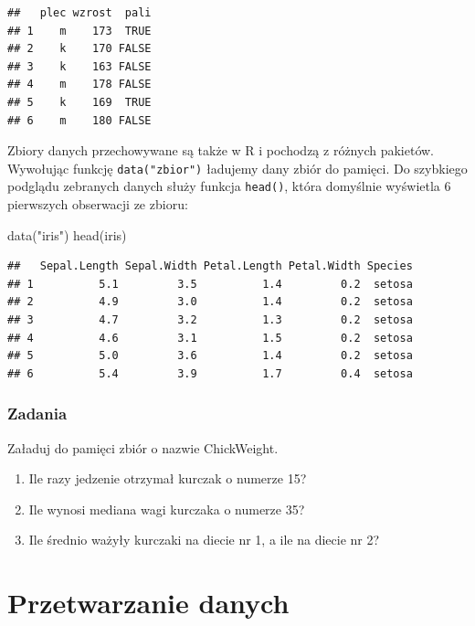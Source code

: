 \documentclass[
]{book}
\newenvironment{Shaded}{\begin{snugshade}}{\end{snugshade}}
\newcommand{\FunctionTok}[1]{\textcolor[rgb]{0.00,0.00,0.00}{#1}}
\newcommand{\NormalTok}[1]{#1}
\newcommand{\StringTok}[1]{\textcolor[rgb]{0.31,0.60,0.02}{#1}}
\providecommand{\tightlist}{%
  \setlength{\itemsep}{0pt}\setlength{\parskip}{0pt}}
\begin{document}
\begin{verbatim}
##   plec wzrost  pali
## 1    m    173  TRUE
## 2    k    170 FALSE
## 3    k    163 FALSE
## 4    m    178 FALSE
## 5    k    169  TRUE
## 6    m    180 FALSE
\end{verbatim}

Zbiory danych przechowywane są także w R i pochodzą z różnych pakietów. Wywołując funkcję \texttt{data("zbior")} ładujemy dany zbiór do pamięci. Do szybkiego podglądu zebranych danych służy funkcja \texttt{head()}, która domyślnie wyświetla 6 pierwszych obserwacji ze zbioru:

\begin{Shaded}
\begin{Highlighting}[]
\FunctionTok{data}\NormalTok{(}\StringTok{"iris"}\NormalTok{)}
\FunctionTok{head}\NormalTok{(iris)}
\end{Highlighting}
\end{Shaded}

\begin{verbatim}
##   Sepal.Length Sepal.Width Petal.Length Petal.Width Species
## 1          5.1         3.5          1.4         0.2  setosa
## 2          4.9         3.0          1.4         0.2  setosa
## 3          4.7         3.2          1.3         0.2  setosa
## 4          4.6         3.1          1.5         0.2  setosa
## 5          5.0         3.6          1.4         0.2  setosa
## 6          5.4         3.9          1.7         0.4  setosa
\end{verbatim}

\hypertarget{zadania-1}{%
\subsection{Zadania}\label{zadania-1}}

Załaduj do pamięci zbiór o nazwie ChickWeight.

\begin{enumerate}
\def\labelenumi{\arabic{enumi}.}
\tightlist
\item
  Ile razy jedzenie otrzymał kurczak o numerze 15?
\item
  Ile wynosi mediana wagi kurczaka o numerze 35?
\item
  Ile średnio ważyły kurczaki na diecie nr 1, a ile na diecie nr 2?
\end{enumerate}

\hypertarget{przetwarzanie-danych}{%
\chapter{Przetwarzanie danych}\label{przetwarzanie-danych}}
\end{document}
